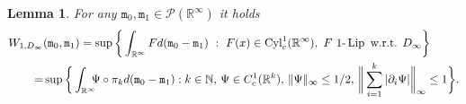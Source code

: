 \documentclass[10pt,leqno]{amsart}
\numberwithin{equation}{section}
\newtheorem{lemma}[teorema]{Lemma}
\newcommand{\R}{\mathbb{R}}
\newcommand{\N}{\mathbb{N}}
\newcommand{\PP}{\mathcal{P}}
\begin{document}
\begin{lemma}\label{lemma: dual cyl R infty}
    For any $\mathtt{m}_0,\mathtt{m}_1\in \PP(\R^\infty)$ it holds
    \begin{equation}\label{dual formula R^infty}
    \begin{aligned}
        W_{1,D_\infty} &(\mathtt{m}_0,\mathtt{m}_1) =  \sup \bigg\{ \int_{\R^\infty} F d(\mathtt{m}_0-\mathtt{m}_1) \ : \ F(x)\in\operatorname{Cyl}_c^1(\R^\infty), \ F \ 1\text{-}\operatorname{Lip} \text{ w.r.t. } D_\infty\bigg\}
        \\
        = & \sup \bigg\{ \int_{\R^\infty}\hspace{-0.2cm} \Psi\circ \pi_k d(\mathtt{m}_0-\mathtt{m}_1)  :  k\in \N, \, \Psi \in C_c^1(\R^k), \, \|\Psi\|_\infty\leq 1/2,\, \bigg\|\sum_{i=1}^k|\partial_i\Psi|\bigg\|_\infty \leq 1\bigg\}
        .
    \end{aligned}
    \end{equation}
\end{lemma}
\end{document}
